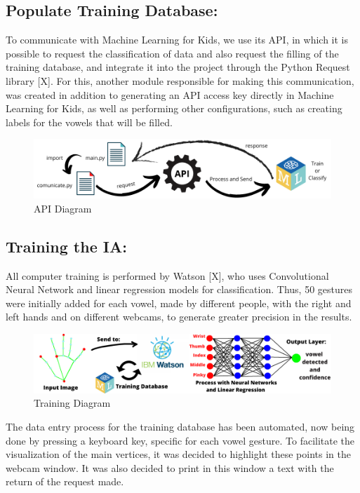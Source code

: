 \documentclass[a4paper, 12pt]{article}
\begin{document}
\subsection{Populate Training Database:}
To communicate with Machine Learning for Kids, we use its API, in which it is possible to request the classification of data and also request the filling of the training database, and integrate it into the project through the Python Request library [X]. For this, another module responsible for making this communication, was created in addition to generating an API access key directly in Machine Learning for Kids, as well as performing other configurations, such as creating labels for the vowels that will be filled.

 \begin{figure}[!ht]
\centering
\includegraphics[scale=0.5]{img/api_diagram.png}
\caption{API Diagram}
\label{figure_6}
\end{figure}



\subsection{Training the IA:}
All computer training is performed by Watson [X], who uses Convolutional Neural Network and linear regression models for classification. Thus, 50 gestures were initially added for each vowel, made by different people, with the right and left hands and on different webcams, to generate greater precision in the results.

 \begin{figure}[!ht]
\centering
\includegraphics[scale=0.5]{img/training_diagram.png}
\caption{Training Diagram}
\label{figure_7}
\end{figure}

The data entry process for the training database has been automated, now being done by pressing a keyboard key, specific for each vowel gesture.
To facilitate the visualization of the main vertices, it was decided to highlight these points in the webcam window. It was also decided to print in this window a text with the return of the request made.
\end{document}
